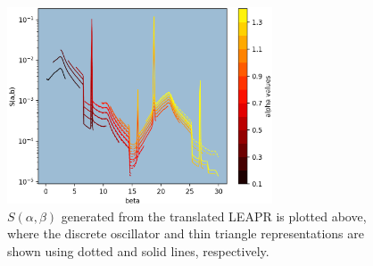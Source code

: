 \documentclass[Master.tex]{subfiles}
\begin{document}
    \begin{figure}[h]
      \begin{center}
        \includegraphics[width=0.7\textwidth]{sab_thinTriangle_and_delta_all_ABb}
        \caption[$S(\alpha,\beta)$ grid, comparing oscillator vs. thin triangle representation (translated LEAPR used)]{$S(\alpha,\beta)$ generated from the translated LEAPR is plotted above, where the discrete oscillator and thin triangle representations are shown using dotted and solid lines, respectively.}
        \label{fig:sabThinTriangleAllAB}
      \end{center}
    \end{figure}
\end{document}
